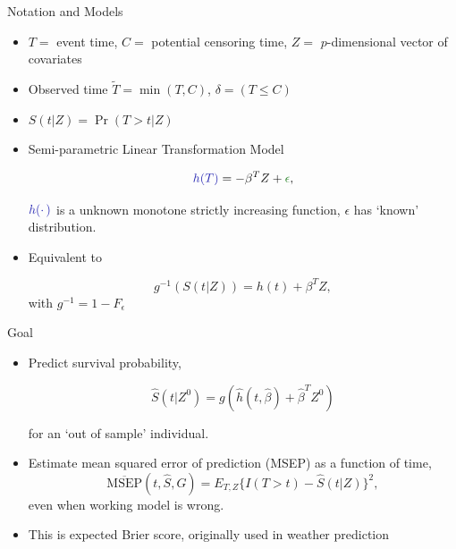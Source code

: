 \documentclass[11pt]{beamer}
\begin{document}
\begin{frame}{Notation and Models}

\begin{itemize}
  \item $T = $ event time, $C = $ potential censoring time, $Z = $
  $p$-dimensional vector of covariates

  \item Observed time $\tilde{T} = \min(T,C)$, $\delta = (T \leq C)$

  \item $S(t|Z) = \Pr(T>t | Z)$

  
   \item Semi-parametric Linear Transformation Model

      \begin{equation*}
        \textcolor{darkblue}{h(T)} = - \beta^T Z +
        \textcolor{forest}{\epsilon},
     \end{equation*}
\vspace{-.5em}

   $\textcolor{darkblue}{h(\cdotp)}$ is a unknown monotone strictly
   increasing function, \textcolor{forest}{$\epsilon$} has `known'
   distribution.

  \item Equivalent to 

   \begin{equation*}
   g^{-1}(S(t|Z)) = h(t) + \beta^T Z,
   \end{equation*}
with  $g^{-1} = 1 - F_\epsilon $

\end{itemize}


\end{frame}

\begin{frame}{Goal}

\begin{itemize}

\item Predict survival probability, 

  \begin{equation*}
  \hat{S}(t | Z^0) = g(\hat{h}(t,\hat{\beta}) 
     + \hat{\beta}^T Z^0)
  \end{equation*} 
  
  for an `out of sample' individual.

\item Estimate mean squared error of prediction (MSEP) as a
function of time, 
\begin{equation*}
\overline{\text{MSEP}}(t, \hat{S}, G) = E_{T, Z} \{I(T > t) - 
\hat{S}(t|Z) \}^2,
\end{equation*}
even when working model is wrong.

\item  This is expected Brier score, originally used in weather
prediction

\end{itemize}

\end{frame}
\end{document}
